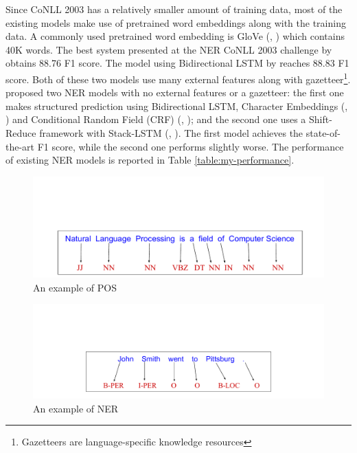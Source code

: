 Since CoNLL 2003 has a relatively smaller amount of training data, most of the existing models make use of pretrained word embeddings along with the training data. A commonly used pretrained word embedding is GloVe (\citeauthor{pennington2014glove}, \citeyear{pennington2014glove}) which contains 40K words. The best system presented at the NER CoNLL 2003 challenge by \cite{florian2003named} obtains 88.76 F1 score. The model using Bidirectional LSTM by \cite{huang2015bidirectional} reaches 88.83 F1 score. Both of these two models use many external features along with gazetteer\footnote{Gazetteers are language-specific knowledge resources}. \cite{lample2016neural} proposed two NER models with no external features or a gazetteer: the first one makes structured prediction using Bidirectional LSTM, Character Embeddings (\citeauthor{ling2015finding}, \citeyear{ling2015finding}) and Conditional Random Field (CRF) (\citeauthor{lafferty2001conditional}, \citeyear{lafferty2001conditional}); and the second one uses a Shift-Reduce framework with Stack-LSTM (\citeauthor{dyer2015transition}, \citeyear{dyer2015transition}). The first model achieves the state-of-the-art F1 score, while the second one performs slightly worse. The performance of existing NER models is reported in Table \ref{table:my-performance}.




\begin{figure}
  \centering
  \includegraphics[scale=0.5]{posex.pdf}
 \caption{An example of POS}
  \label{fig:pos-ex}
\end{figure}

\begin{figure}
  \centering
  \includegraphics[scale=0.5]{nerex.pdf}
 \caption{An example of NER}
  \label{fig:ner-ex}
\end{figure}


